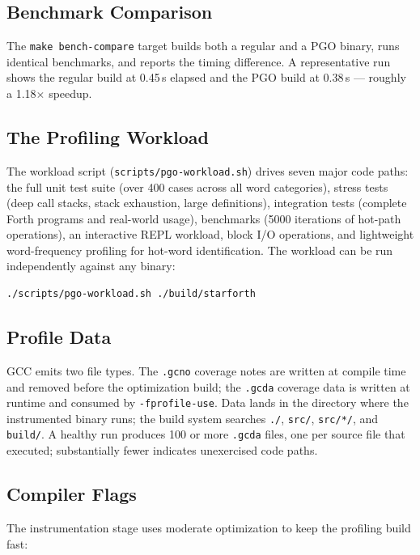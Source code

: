 \subsection{Benchmark Comparison}

The \texttt{make bench-compare} target builds both a regular and a PGO binary,
runs identical benchmarks, and reports the timing difference. A representative
run shows the regular build at 0.45\,s elapsed and the PGO build at 0.38\,s ---
roughly a 1.18$\times$ speedup.

\subsection{The Profiling Workload}

The workload script (\texttt{scripts/pgo-workload.sh}) drives seven major code
paths: the full unit test suite (over 400 cases across all word categories),
stress tests (deep call stacks, stack exhaustion, large definitions),
integration tests (complete Forth programs and real-world usage), benchmarks
(5000 iterations of hot-path operations), an interactive REPL workload, block
I/O operations, and lightweight word-frequency profiling for hot-word
identification. The workload can be run independently against any binary:

\begin{lstlisting}[language=bash]
./scripts/pgo-workload.sh ./build/starforth
\end{lstlisting}

\subsection{Profile Data}

GCC emits two file types. The \texttt{.gcno} coverage notes are written at
compile time and removed before the optimization build; the \texttt{.gcda}
coverage data is written at runtime and consumed by \texttt{-fprofile-use}.
Data lands in the directory where the instrumented binary runs; the build
system searches \texttt{./}, \texttt{src/}, \texttt{src/*/}, and
\texttt{build/}. A healthy run produces 100 or more \texttt{.gcda} files, one
per source file that executed; substantially fewer indicates unexercised code
paths.

\subsection{Compiler Flags}

The instrumentation stage uses moderate optimization to keep the profiling
build fast:


